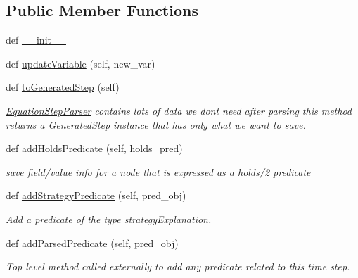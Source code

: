 \subsection*{Public Member Functions}
\begin{DoxyCompactItemize}
\item 
def \hyperlink{classtotally__new__visualizer_1_1_equation_step_parser_a025ac2e5112841d4b340029c120412f2}{\+\_\+\+\_\+init\+\_\+\+\_\+}
\item 
def \hyperlink{classtotally__new__visualizer_1_1_equation_step_parser_a7fd1c20efb5a99c2198f0731c9c9aba1}{update\+Variable} (self, new\+\_\+var)
\item 
def \hyperlink{classtotally__new__visualizer_1_1_equation_step_parser_acdeafbce50645287ac85046e93191c5a}{to\+Generated\+Step} (self)
\begin{DoxyCompactList}\small\item\em \hyperlink{classtotally__new__visualizer_1_1_equation_step_parser}{Equation\+Step\+Parser} contains lots of data we don\textquotesingle{}t need after parsing this method returns a Generated\+Step instance that has only what we want to save. \end{DoxyCompactList}\item 
def \hyperlink{classtotally__new__visualizer_1_1_equation_step_parser_a8e28e68df8ed9c7a34890d4ae6a6e2b9}{add\+Holds\+Predicate} (self, holds\+\_\+pred)
\begin{DoxyCompactList}\small\item\em save field/value info for a node that is expressed as a holds/2 predicate \end{DoxyCompactList}\item 
def \hyperlink{classtotally__new__visualizer_1_1_equation_step_parser_a0ea8c9f9125d10c34db60080cb98087e}{add\+Strategy\+Predicate} (self, pred\+\_\+obj)
\begin{DoxyCompactList}\small\item\em Add a predicate of the type \textquotesingle{}strategy\+Explanation\textquotesingle{}. \end{DoxyCompactList}\item 
def \hyperlink{classtotally__new__visualizer_1_1_equation_step_parser_ae60e437d9daae3ce0a8dae2fd8e60260}{add\+Parsed\+Predicate} (self, pred\+\_\+obj)
\begin{DoxyCompactList}\small\item\em Top level method called externally to add any predicate related to this time step. \end{DoxyCompactList}\item 

\end{DoxyCompactItemize}
